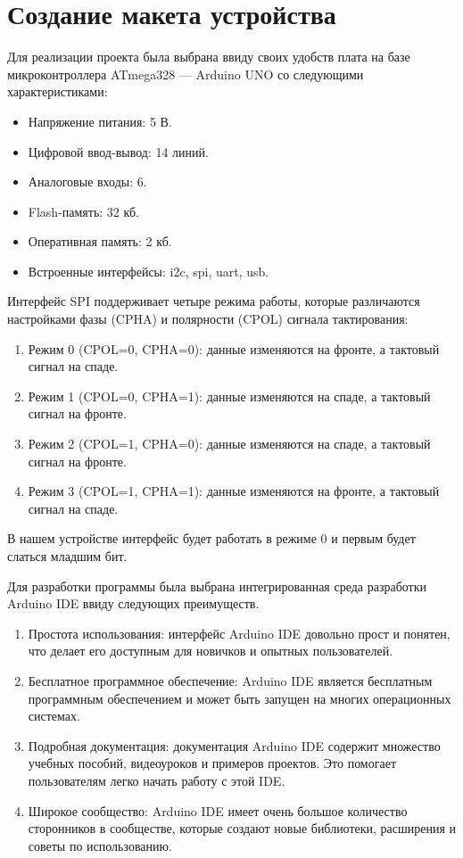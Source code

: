 \documentclass[14pt, oneside]{altsu-report}
\begin{document}
	
	

\chapter{Создание макета устройства} %
	Для реализации проекта была выбрана ввиду своих удобств плата на базе микроконтроллера ATmega328 --- Arduino UNO со следующими характеристиками: 
	\begin{itemize}
		\item Напряжение питания: 5 В.
		\item Цифровой ввод-вывод: 14 линий.
		\item Аналоговые входы: 6.
		\item Flash-память: 32 кб.
		\item Оперативная память: 2 кб.
		\item Встроенные интерфейсы: i2c, spi, uart, usb.
	\end{itemize}
	
		Интерфейс SPI поддерживает четыре режима работы, которые различаются настройками фазы (CPHA) и полярности (CPOL) сигнала тактирования:
	\begin{enumerate}
		\item Режим 0 (CPOL=0, CPHA=0): данные изменяются на фронте, а тактовый сигнал на спаде.
		\item Режим 1 (CPOL=0, CPHA=1): данные изменяются на спаде, а тактовый сигнал на фронте.
		\item Режим 2 (CPOL=1, CPHA=0): данные изменяются на спаде, а тактовый сигнал на фронте.
		\item Режим 3 (CPOL=1, CPHA=1): данные изменяются на фронте, а тактовый сигнал на спаде.
	\end{enumerate}
	
		В нашем устройстве интерфейс будет работать в режиме 0 и первым будет слаться младшим бит.
	
	Для разработки программы была выбрана интегрированная среда разработки Arduino IDE ввиду следующих преимуществ.
	\begin{enumerate}
		\item Простота использования: интерфейс Arduino IDE довольно прост и понятен, что делает его доступным для новичков и опытных пользователей.
		\item Бесплатное программное обеспечение: Arduino IDE является бесплатным программным обеспечением и может быть запущен на многих операционных системах.
		\item Подробная документация: документация Arduino IDE содержит множество учебных пособий, видеоуроков и примеров проектов. Это помогает пользователям легко начать работу с этой IDE.
		\item Широкое сообщество: Arduino IDE имеет очень большое количество сторонников в сообществе, которые создают новые библиотеки, расширения и советы по использованию.
	\end{enumerate}
	
\end{document}

